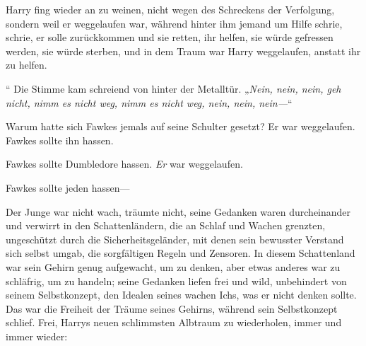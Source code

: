 Harry fing wieder an zu weinen, nicht wegen des Schreckens der Verfolgung, sondern weil er weggelaufen war, während hinter ihm jemand um Hilfe schrie, schrie, er solle zurückkommen und sie retten, ihr helfen, sie würde gefressen werden, sie würde sterben, und in dem Traum war Harry weggelaufen, anstatt ihr zu helfen.

“ Die Stimme kam schreiend von hinter der Metalltür. „\emph{Nein, nein, nein, geh nicht, nimm es nicht weg, nimm es nicht weg, nein, nein, nein—}“

Warum hatte sich Fawkes jemals auf seine Schulter gesetzt? Er war weggelaufen. Fawkes sollte ihn hassen.

Fawkes sollte Dumbledore hassen. \emph{Er} war weggelaufen.

Fawkes sollte jeden hassen—

Der Junge war nicht wach, träumte nicht, seine Gedanken waren durcheinander und verwirrt in den Schattenländern, die an Schlaf und Wachen grenzten, ungeschützt durch die Sicherheitsgeländer, mit denen sein bewusster Verstand sich selbst umgab, die sorgfältigen Regeln und Zensoren. In diesem Schattenland war sein Gehirn genug aufgewacht, um zu denken, aber etwas anderes war zu schläfrig, um zu handeln; seine Gedanken liefen frei und wild, unbehindert von seinem Selbstkonzept, den Idealen seines wachen Ichs, was er nicht denken sollte. Das war die Freiheit der Träume seines Gehirns, während sein Selbstkonzept schlief. Frei, Harrys neuen schlimmsten Albtraum zu wiederholen, immer und immer wieder:

